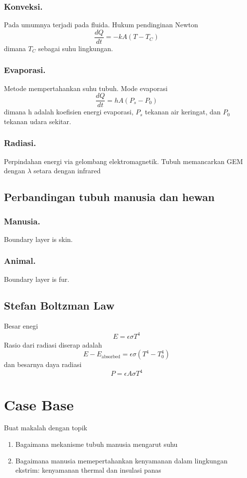 \documentclass[../../main.tex]{subfiles}
\begin{document}
\subsubsection{Konveksi.}
Pada umumnya terjadi pada fluida. Hukum pendinginan Newton 
\begin{equation*}
    \frac{dQ}{dt}=-kA(T-T_C)
\end{equation*}
dimana $T_C$ sebagai suhu lingkungan.
\subsubsection{Evaporasi.} Metode mempertahankan suhu tubuh. Mode evaporasi 
\begin{equation*}
    \frac{dQ}{dt}=hA(P_s-P_0)
\end{equation*}
dimana h adalah koefisien energi evaporasi, $P_s$ tekanan air keringat, dan $P_0$ tekanan udara sekitar.

\subsubsection{Radiasi.} Perpindahan energi via gelombang elektromagnetik. Tubuh memancarkan GEM dengan $\lambda$ setara dengan infrared

\subsection{Perbandingan tubuh manusia dan hewan}
\subsubsection{Manusia.} Boundary layer is skin.
\subsubsection{Animal.} Boundary layer is fur.

\subsection{Stefan Boltzman Law}
Besar enegi
\begin{eqnarray}
    E=\epsilon\sigma T^4
\end{eqnarray}
Rasio dari radiasi diserap adalah
\begin{equation*}
    E-E_{\text{absorbed}}=\epsilon \sigma (T^4-T_0^4)
\end{equation*}
dan besarnya daya radiasi 
\begin{equation*}
    P=\epsilon A \sigma T^4
\end{equation*}

\section{Case Base} Buat makalah dengan topik
\begin{enumerate}
\item Bagaimana mekanisme tubuh manusia mengarut suhu
\item Bagaimana manusia memepertahankan kenyamanan dalam lingkungan ekstrim: kenyamanan thermal dan insulasi panas
\end{enumerate}
\end{document}
